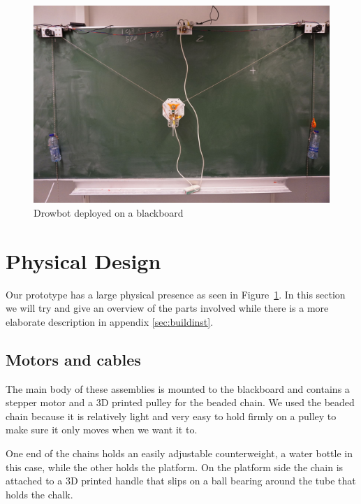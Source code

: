 \documentclass[12pt]{article}
\begin{document}


\begin{figure}
  \centering
  \includegraphics{img/overview_rs.jpg}
  \caption{Drowbot deployed on a blackboard}
  \label{fig:overview}
\end{figure}
\section{Physical Design}
\label{sec:design}
Our prototype has a large physical presence as seen in Figure~\ref{fig:overview}.
In this section we will try and give an overview of the parts involved
while there is a more elaborate description in appendix \ref{sec:buildinst}.

\subsection*{Motors and cables}
The main body of these assemblies is mounted to the blackboard and
contains a stepper motor and a 3D printed pulley for the beaded chain.
We used the beaded chain because it is relatively light and very
easy to hold firmly on a pulley to make sure it only moves when
we want it to.

One end of the chains holds an easily adjustable counterweight,
a water bottle in this case, while the other holds the platform.
On the platform side the chain is attached to a 3D printed handle
that slips on a ball bearing around the tube that holds the chalk.
\end{document}
